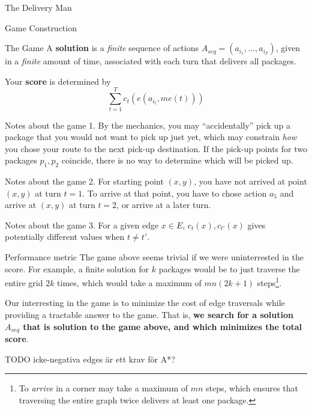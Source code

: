 \begin{section}{The Delivery Man}
\begin{subsection}{Game Construction}
\begin{subsubsection}{The Game}
      A \textbf{solution} is a \textit{finite} sequence of actions $A_{seq} = (a_{i_1}, ..., a_{i_T})$, given in a \textit{finite} amount of time, associated with each turn that delivers all packages.

      Your \textbf{score} is determined by
      \begin{equation*}
        \sum_{t = 1}^T c_t(e(a_{i_t}, me(t)))
      \end{equation*}      

      \begin{paragraph}{Notes about the game 1.}
        By the mechanics, you may ``accidentally'' pick up a package that you would not want to pick up just yet, which may constrain \textit{how} you chose your route to the next pick-up destination. If the pick-up points for two packages $p_1, p_2$ coincide, there is no way to determine which will be picked up.
      \end{paragraph}

      \begin{paragraph}{Notes about the game 2.}
        For starting point $(x, y)$, you have not arrived at point $(x,y)$ at turn $t=1$. To arrive at that point, you have to chose action $a_5$ and arrive at $(x, y)$ at turn $t=2$, or arrive at a later turn.
      \end{paragraph}

      \begin{paragraph}{Notes about the game 3.}
        For a given edge $x\in E$, $c_t(x), c_{t'}(x)$ gives potentially different values when $t \neq t'$.
      \end{paragraph}

    \end{subsubsection}
    
    \begin{subsubsection}{Performance metric}
      The game above seems trivial if we were uninterrested in the score. For example, a finite solution for $k$ packages would be to just traverse the entire grid $2k$ times, which would take a maximum of $mn(2k+1)$ steps\footnote{To \textit{arrive} in a corner may take a maximum of $mn$ steps, which ensures that traversing the entire graph twice delivers at least one package.}.

      Our interresting in the game is to minimize the cost of edge traversals while providing a tractable answer to the game. That is, \textbf{we search for a solution $A_{seq}$ that is solution to the game above, and which minimizes the total score}. 
    \end{subsubsection}

    TODO icke-negativa edges är ett krav för A*?
  \end{subsection}

  

\end{section}
